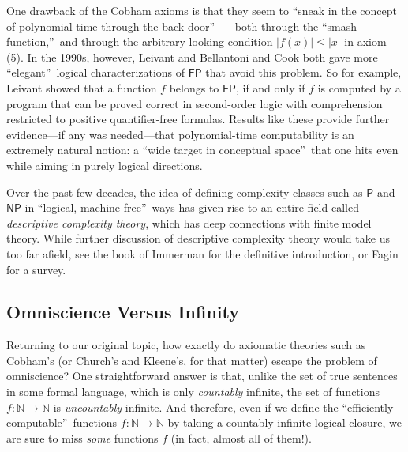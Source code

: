 \documentclass[12pt,onecolumn]{article}%
\begin{document}
One drawback of the Cobham axioms is that they seem to \textquotedblleft sneak
in the concept of polynomial-time through the back door\textquotedblright\ %
---both through the \textquotedblleft smash function,\textquotedblright\  and
through the arbitrary-looking condition $\left\vert f(x)
\right\vert \leq\left\vert x\right\vert $ in axiom (5). In the 1990s,
however, Leivant \cite{leivant} and Bellantoni and Cook \cite{bellantonicook}
both gave more \textquotedblleft elegant\textquotedblright\  logical
characterizations of $\mathsf{FP}$ that avoid this problem. So for example,
Leivant showed that a function $f$ belongs to $\mathsf{FP}$, if and only if
$f$ is computed by a program that can be proved correct in second-order logic
with comprehension restricted to positive quantifier-free formulas. Results
like these provide further evidence---if any was needed---that polynomial-time
computability is an extremely natural notion: a \textquotedblleft wide target
in conceptual space\textquotedblright\  that one hits even while aiming in
purely logical directions.

Over the past few decades, the idea of defining complexity classes such as
$\mathsf{P}$ and $\mathsf{NP}$ in \textquotedblleft logical,
machine-free\textquotedblright\  ways has given rise to an entire field called
\textit{descriptive complexity theory}, which has deep connections with finite
model theory. While further discussion of descriptive complexity theory
would take us too far afield, see the book of Immerman \cite{immerman} for
the definitive introduction, or Fagin \cite{fagin} for a survey.

\subsection{Omniscience Versus Infinity\label{OMNIINF}}

Returning to our original topic, how exactly do axiomatic theories such as
Cobham's (or Church's and Kleene's, for that matter) escape the problem of
omniscience? One straightforward answer is that, unlike the set of true
sentences in some formal language, which is only \textit{countably} infinite,
the set of functions $f:\mathbb{N}\rightarrow\mathbb{N}$ is
\textit{uncountably} infinite. And therefore, even if we define the
\textquotedblleft efficiently-computable\textquotedblright\  functions
$f:\mathbb{N}\rightarrow\mathbb{N}$ by taking a countably-infinite logical
closure, we are sure to miss \textit{some} functions $f$ (in fact, almost all
of them!).
\end{document}
